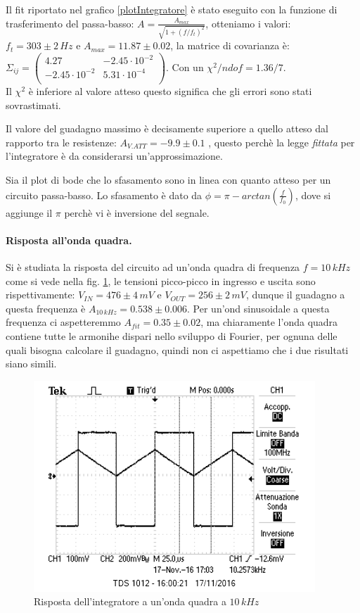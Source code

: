 \documentclass[10pt,a4paper]{article}
\begin{document}
Il fit riportato nel grafico \ref{plotIntegratore} è stato eseguito con la funzione di trasferimento del passa-basso: $ A=\frac{A_{max}}{\sqrt{1+(f/f_t)^2}}$, otteniamo i valori: $f_t = 303 \pm 2 \, Hz$ e $A_{max} = 11.87 \pm 0.02$, la matrice di covarianza è:\\ $ \Sigma_{ij} = \left( \begin{array}{cc}
4.27 & -2.45 \cdot 10^{-2} \\ 
-2.45 \cdot 10^{-2} & 5.31 \cdot 10^{-4}\\
\end{array} \right)$. Con un $\chi^2/ndof = 1.36/7$.\\
Il $\chi^2$ è inferiore al valore atteso questo significa che gli errori sono stati sovrastimati. 

Il valore del guadagno massimo è decisamente superiore a quello atteso dal rapporto tra le resistenze: $A_{V.ATT}= -9.9 \pm 0.1$ , questo perchè la legge \emph{fittata} per l'integratore è da considerarsi un'approssimazione.

Sia il plot di bode che lo sfasamento sono in linea con quanto atteso per un circuito passa-basso. Lo sfasamento è dato da $\phi = \pi - arctan \left( \frac{f}{f_0} \right)$, dove si aggiunge il $\pi$ perchè vi è inversione del segnale.


\paragraph{Risposta all'onda quadra.} Si è studiata la risposta del circuito ad un'onda quadra di frequenza $f = 10 \, kHz$ come si vede nella fig. \ref{integratore10}, le tensioni picco-picco in ingresso e uscita sono rispettivamente: $V_{IN} = 476 \pm 4 \, mV$ e $V_{OUT} = 256 \pm 2 \, mV$, dunque il guadagno a questa frequenza è $A_{10\, kHz} = 0.538 \pm 0.006$. Per un'ond sinusoidale a questa frequenza ci aspetteremmo $A_{fit} = 0.35 \pm 0.02$, ma chiaramente l'onda quadra contiene tutte le armonihe dispari nello sviluppo di Fourier, per ognuna delle quali bisogna calcolare il guadagno, quindi non ci aspettiamo che i due risultati siano simili.

\begin{figure}[!htb]
\centering
  \includegraphics[scale=1.0]{immagini/integratore.png}
\caption{Risposta dell'integratore a un'onda quadra a $10\,kHz$}
\label{integratore10}
\end{figure}
\end{document}
